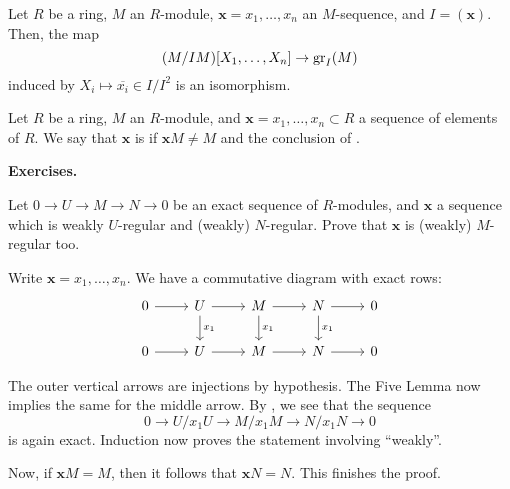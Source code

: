 \documentclass[12pt]{article}
\begin{document}
\begin{thm} \label{thm:regular-polynomial-graded-isomorphism}
	Let $R$ be a ring, $M$ an $R$-module, $\mathbf{x} = x_{1}, \ldots, x_{n}$ an $M$-sequence, and $I = (\mathbf{x})$. Then, the map
	\begin{equation*} 
		(M/IM)[X_{1}, \ldots, X_{n}] \to \operatorname{gr}_{I}(M)
	\end{equation*}
	induced by $X_{i} \mapsto \overline{x_{i}} \in I/I^{2}$ is an isomorphism.
\end{thm}

\begin{defn}
	Let $R$ be a ring, $M$ an $R$-module, and $\mathbf{x} = x_{1}, \ldots, x_{n} \subset R$ a sequence of elements of $R$. \newline
	We say that $\mathbf{x}$ is  if $\mathbf{x} M \neq M$ and the conclusion of .
\end{defn}

\textbf{Exercises.}

\begin{exe}
	Let $0 \to U \to M \to N \to 0$ be an exact sequence of $R$-modules, and $\mathbf{x}$ a sequence which is weakly $U$-regular and (weakly) $N$-regular. Prove that $\mathbf{x}$ is (weakly) $M$-regular too.
\end{exe}
\begin{soln}
	Write $\mathbf{x} = x_{1}, \ldots, x_{n}$. We have a commutative diagram with exact rows:
	\begin{equation*} 
		\begin{tikzcd}
			0 \arrow[r] & U \arrow[d, "x_{1}"] \arrow[r] & M \arrow[d, "x_{1}"] \arrow[r] & N \arrow[d, "x_{1}"] \arrow[r] & 0 \\
			0 \arrow[r] & U \arrow[r] & M \arrow[r] & N \arrow[r] & 0
		\end{tikzcd}
	\end{equation*}

	The outer vertical arrows are injections by hypothesis. The Five Lemma now implies the same for the middle arrow. By , we see that the sequence
	\begin{equation*} 
		0 \to U/x_{1} U \to M/x_{1} M \to N/x_{1} N \to 0
	\end{equation*}
	is again exact. Induction now proves the statement involving ``weakly''.

	Now, if $\mathbf{x} M = M$, then it follows that $\mathbf{x} N = N$. This finishes the proof.
\end{soln}
\end{document}
